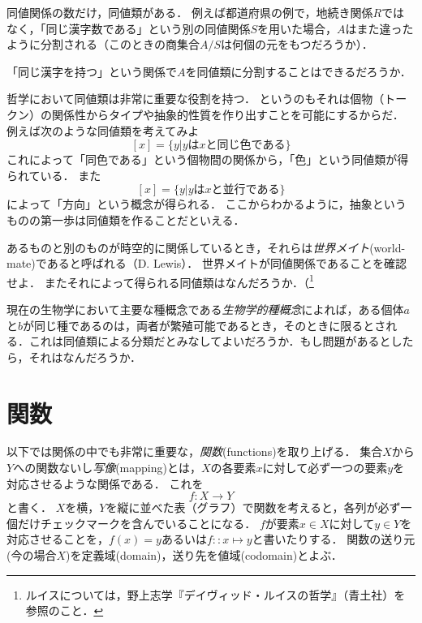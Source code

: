 \documentclass[11pt,a4paper]{bxjsarticle}
\begin{document}
同値関係の数だけ，同値類がある．
例えば都道府県の例で，地続き関係$R$ではなく，「同じ漢字数である」という別の同値関係$S$を用いた場合，$A$はまた違ったように分割される（このときの商集合$A/S$は何個の元をもつだろうか）．

\begin{renshu}{}{}
「同じ漢字を持つ」という関係で$A$を同値類に分割することはできるだろうか．
\end{renshu}

哲学において同値類は非常に重要な役割を持つ．
というのもそれは個物（トークン）の関係性からタイプや抽象的性質を作り出すことを可能にするからだ．
例えば次のような同値類を考えてみよ
\[
 [x] = \{ y | y \text{は} x \text{と同じ色である}\}
\]
これによって「同色である」という個物間の関係から，「色」という同値類が得られている．
また
\[
 [x] = \{ y | y \text{は} x \text{と並行である}\}
\]
によって「方向」という概念が得られる．
ここからわかるように，抽象というものの第一歩は同値類を作ることだといえる．


\begin{rei}{}{}
 あるものと別のものが時空的に関係しているとき，それらは\emph{世界メイト}(world-mate)であると呼ばれる（D. Lewis）．
 世界メイトが同値関係であることを確認せよ．
 またそれによって得られる同値類はなんだろうか．（\footnote{ルイスについては，野上志学『デイヴィッド・ルイスの哲学』（青土社）を参照のこと．}
\end{rei}


\begin{rei}{}{}
 現在の生物学において主要な種概念である\emph{生物学的種概念}によれば，ある個体$a$と$b$が同じ種であるのは，両者が繁殖可能であるとき，そのときに限るとされる．これは同値類による分類だとみなしてよいだろうか．もし問題があるとしたら，それはなんだろうか．
\end{rei}



\section{関数}
以下では関係の中でも非常に重要な，\emph{関数}(functions)を取り上げる．
集合$X$から$Y$への関数ないし\emph{写像}(mapping)とは，$X$の各要素$x$に対して必ず一つの要素$y$を対応させるような関係である．
これを
\[
 f : X \to Y
\]
と書く．
$X$を横，$Y$を縦に並べた表（グラフ）で関数を考えると，各列が必ず一個だけチェックマークを含んでいることになる．
$f$が要素$x \in X$に対して$y \in Y$を対応させることを，$f(x)=y$あるいは$f::x \mapsto y$と書いたりする．
関数の送り元(今の場合$X$)を定義域(domain)，送り先を値域(codomain)とよぶ．
\end{document}
